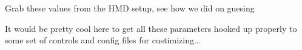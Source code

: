 
\begin{DoxyRefList}
\item[\label{todo__todo000002}%
\hypertarget{todo__todo000002}{}%
Member \hyperlink{class_b_g_e_1_1_rift_controller_a648923024ea31a041f029ed4d33686ae}{B\-G\-E\-:\-:Rift\-Controller\-:\-:Init\-O\-V\-R} ()]Grab these values from the H\-M\-D setup, see how we did on guesing  
\item[\label{todo__todo000001}%
\hypertarget{todo__todo000001}{}%
Member \hyperlink{class_b_g_e_1_1_rift_controller_ac99fd67e360b2f6c41726db899ee71d9}{B\-G\-E\-:\-:Rift\-Controller\-:\-:Present\-Fbo\-\_\-\-Post\-Process\-Distortion} (const O\-V\-R\-::\-Util\-::\-Render\-::\-Stereo\-Eye\-Params \&eye\-Params)]It would be pretty cool here to get all these parameters hooked up properly to some set of controls and config files for custimizing... 
\end{DoxyRefList}
